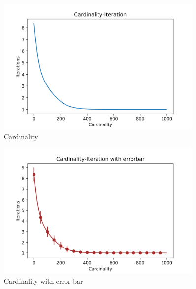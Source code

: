 \documentclass[a4paper,12pt]{article}
\begin{document}
    \begin{figure}[H]
    	\centering
    	\includegraphics[width=0.9\textwidth]{Card50_4_1000_1500_e3}
    	\caption{Cardinality}\label{Card50_4_1000_1500_e3}
    \end{figure}
    \begin{figure}[H]
    	\centering
    	\includegraphics[width=0.9\textwidth]{CardErr50_4_1000_1500_e3}
    	\caption{Cardinality with error bar}\label{CardErr50_4_1000_1500_e3}
    \end{figure}
\end{document}
